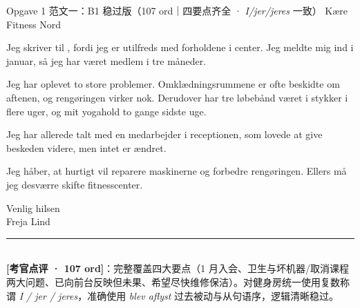 \begin{emailbox}{Opgave 1 范文一：B1 稳过版（107 ord｜四要点齐全 · \textit{I/jer/jeres} 一致）}
Kære Fitness Nord

\vspace{0.25em}
Jeg skriver til , fordi jeg er utilfreds med forholdene i  center. Jeg meldte mig ind i januar, så jeg har været medlem i tre måneder.

\vspace{0.25em}
Jeg har oplevet to store problemer. Omklædningsrummene er ofte beskidte om aftenen, og rengøringen virker  nok. Derudover har tre løbebånd været i stykker i flere uger, og mit yogahold  to gange sidste uge.

\vspace{0.25em}
Jeg har allerede talt med en medarbejder i receptionen, som lovede at give beskeden videre, men intet er ændret.

\vspace{0.25em}
Jeg håber, at  hurtigt vil reparere maskinerne og forbedre rengøringen. Ellers må jeg desværre skifte fitnesscenter.

\vspace{0.25em}
Venlig hilsen\\
Freja Lind

\vspace{0.3em}
\rule{\linewidth}{0.4pt}\\[0.2em]
\small\textbf{\color{NCDTeal}[考官点评 · 107 ord]}：完整覆盖四大要点（1 月入会、卫生与坏机器/取消课程两大问题、已向前台反映但未果、希望尽快维修保洁）。对健身房统一使用复数称谓 \textit{I / jer / jeres}，准确使用 \textit{blev aflyst} 过去被动与从句语序，逻辑清晰稳过。
\end{emailbox}

